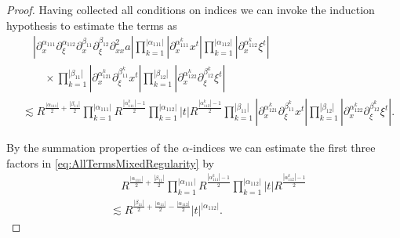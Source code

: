 \documentclass{amsart}
\theoremstyle{definition}
\begin{document}
\begin{proof}
Having collected all conditions on indices we can invoke the induction hypothesis to estimate the terms as
\begin{equation}
\label{eq:AllTermsMixedRegularity}
\begin{split}
&\quad |\partial_x^{\alpha_{111}} \partial_{\xi}^{\alpha_{112}} \partial_x^{\beta_{11}} \partial_{\xi}^{\beta_{12}} \partial^2_{xx} a | \prod_{k=1}^{|\alpha_{111}|} |\partial_x^{\alpha_{111}^k} x^t | \prod_{k=1}^{|\alpha_{112}|} |\partial_x^{\alpha_{112}^k} \xi^t | \\
&\quad \quad \times \prod_{k=1}^{|\beta_{11}|} |\partial_x^{\alpha_{121}^k} \partial_{\xi}^{\beta_{11}^k} x^t | \prod_{k=1}^{|\beta_{12}|} |\partial_x^{\alpha_{122}^k} \partial_{\xi}^{\beta_{12}^k} \xi^t | \\
&\lesssim R^{\frac{|\alpha_{111}|}{2}+\frac{|\beta_{11}|}{2}} \prod_{k=1}^{|\alpha_{111}|} R^{\frac{|\alpha_{111}^k|-1}{2}} \prod_{k=1}^{|\alpha_{112}|} |t| R^{\frac{|\alpha_{112}^k|-1}{2}} \prod_{k=1}^{|\beta_{11}|} |\partial_x^{\alpha_{121}^k} \partial_{\xi}^{\beta_{11}^k} x^t | \prod_{k=1}^{|\beta_{12}|} |\partial_x^{\alpha_{122}^k} \partial_{\xi}^{\beta_{12}^k} \xi^t |.
\end{split}
\end{equation}

By the summation properties of the $\alpha$-indices we can estimate the first three factors in \eqref{eq:AllTermsMixedRegularity} by
\begin{equation}
\label{eq:JointRegularityI}
\begin{split}
&\quad R^{\frac{|\alpha_{111}|}{2}+\frac{|\beta_{11}|}{2}} \prod_{k=1}^{|\alpha_{111}|} R^{\frac{|\alpha_{111}^k|-1}{2}} \prod_{k=1}^{|\alpha_{112}|} |t| R^{\frac{|\alpha_{112}^k|-1}{2}} \\
&\lesssim R^{\frac{|\beta_{11}|}{2} + \frac{|\alpha_{11}|}{2} - \frac{|\alpha_{112}|}{2}} |t|^{|\alpha_{112}|}.
\end{split}
\end{equation}


\end{proof}
\end{document}
